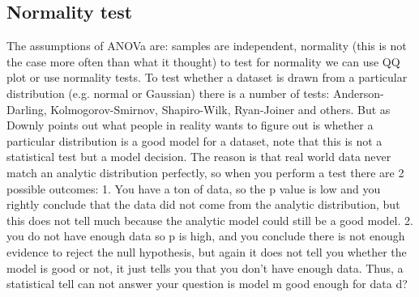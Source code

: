 \documentclass[11pt]{article}
\theoremstyle{definition}
\theoremstyle{remark}
\begin{document}


\subsection{Normality test}
\label{sse:normal}
The assumptions of ANOVa are: samples are independent, normality (this is not the case more often than what it thought) to test for normality we can use QQ plot or use normality tests. To test whether a dataset is drawn from a particular distribution (e.g. normal or Gaussian) there is a number of tests: Anderson-Darling, Kolmogorov-Smirnov, Shapiro-Wilk, Ryan-Joiner and others. 
But as Downly points out what people in reality wants to figure out is whether a particular distribution is a good model for a dataset, note that this  is not a statistical test but a model decision. The reason is that real world data never match an analytic distribution perfectly, so when you perform a test there are 2 possible outcomes:
1. You have a ton of data, so the p value is low and you rightly conclude that the data did not come from the analytic distribution, but this does not tell much because the analytic model could still be a good model. 2. you do not have enough data so p is high, and you conclude there is not enough evidence to reject the null hypothesis, but again it does not tell you whether the model is good or not, it just tells you that you don't have enough data. Thus, a statistical tell can not answer your question is model m good enough for data d?
\end{document}
